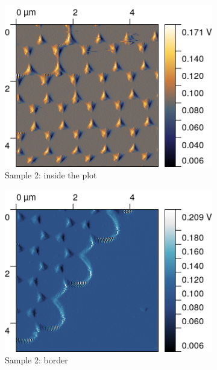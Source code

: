 \documentclass[11pt,a4paper]{article}
\begin{document}
\begin{figure}[H]
\centering
\begin{subfigure}[b]{0.45\textwidth}
\includegraphics[width=\textwidth]{sm_sample2}
\caption{Sample 2: inside the plot}
\label{fig:}
\end{subfigure}
\begin{subfigure}[b]{0.45\textwidth}
\includegraphics[width=\textwidth]{sm_sample2_border}
\caption{Sample 2: border}
\label{fig:}
\end{subfigure}\\\vspace{.2cm}
\begin{subfigure}[b]{0.45\textwidth}

\end{subfigure}
\end{figure}
\end{document}
